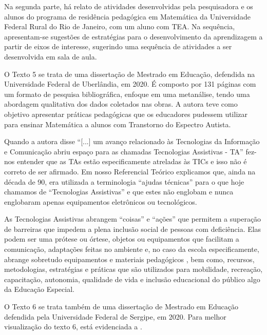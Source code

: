 \documentclass[portuguese]{textolivre}
\begin{document}
Na segunda parte, há relato de atividades desenvolvidas pela
pesquisadora e os alunos do programa de residência pedagógica em
Matemática da Universidade Federal Rural do Rio de Janeiro, com um aluno
com TEA. Na sequência, apresentam-se sugestões de estratégias para o
desenvolvimento da aprendizagem a partir de eixos de interesse,
sugerindo uma sequência de atividades a ser desenvolvida em sala de
aula.

O Texto 5 se trata de uma dissertação de Mestrado em Educação, defendida
na Universidade Federal de Uberlândia, em 2020. É composto por 131
páginas com um formato de pesquisa bibliográfica, enfoque em uma
metanálise, tendo uma abordagem qualitativa dos dados coletados nas
obras. A autora teve como objetivo apresentar práticas pedagógicas que
os educadores pudessem utilizar para ensinar Matemática a alunos com
Transtorno do Espectro Autista.

Quando a autora disse ``{[}...{]} um avanço relacionado às Tecnologias
da Informação e Comunicação abriu espaço para as chamadas Tecnologias
Assistivas - TA'' \cite[p.~100]{santos2020} fez-nos entender que as TAs
estão especificamente atreladas às TICs e isso não é correto de ser
afirmado. Em nosso Referencial Teórico explicamos que, ainda na década
de 90, era utilizada a terminologia ``ajudas técnicas'' para o que hoje
chamamos de ``Tecnologias Assistivas'' e que estes não englobam e nunca
englobaram apenas equipamentos eletrônicos ou tecnológicos.

As Tecnologias Assistivas abrangem ``coisas'' e ``ações'' que permitem a
superação de barreiras que impedem a plena inclusão social de pessoas
com deficiência. Elas podem ser uma prótese ou órtese, objetos ou
equipamentos que facilitam a comunicação, adaptações feitas no ambiente
e, no caso da escola especificamente, abrange sobretudo equipamentos e
materiais pedagógicos \cite{brasil1999}, bem como, recursos,
metodologias, estratégias e práticas \cite{brasil2007} que são
utilizados para mobilidade, recreação, capacitação, autonomia, qualidade
de vida e inclusão educacional do público algo da Educação Especial.

O Texto 6 se trata também de uma dissertação de Mestrado em Educação
defendida pela Universidade Federal de Sergipe, em 2020. Para melhor
visualização do texto 6, está evidenciada a .
\end{document}
